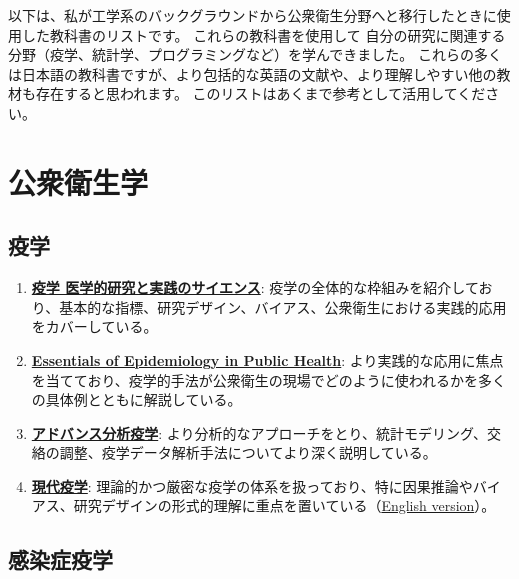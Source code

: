 \documentclass[uplatex]{jsarticle} %
\begin{document}
以下は、私が工学系のバックグラウンドから公衆衛生分野へと移行したときに使用した教科書のリストです。
これらの教科書を使用して
自分の研究に関連する分野（疫学、統計学、プログラミングなど）を学んできました。
これらの多くは日本語の教科書ですが、より包括的な英語の文献や、より理解しやすい他の教材も存在すると思われます。
このリストはあくまで参考として活用してください。

\section{公衆衛生学}

\subsection{疫学}

\begin{enumerate}
\item \href{https://www.molcom.jp/products/detail/52131/}{\textbf{疫学 医学的研究と実践のサイエンス}}: 
疫学の全体的な枠組みを紹介しており、基本的な指標、研究デザイン、バイアス、公衆衛生における実践的応用をカバーしている。

\item \href{https://www.academia.edu/43690544/ESSENTIALS_OF_FOURTH_EDITION}{\textbf{Essentials of Epidemiology in Public Health}}:
より実践的な応用に焦点を当てており、疫学的手法が公衆衛生の現場でどのように使われるかを多くの具体例とともに解説している。

\item \href{https://www.medsi.co.jp/products/detail/3742}{\textbf{アドバンス分析疫学}}:
より分析的なアプローチをとり、統計モデリング、交絡の調整、疫学データ解析手法についてより深く説明している。

\item \href{https://www.gakujutsu.co.jp/product/978-4-7806-1245-5/}{\textbf{現代疫学}}: 
理論的かつ厳密な疫学の体系を扱っており、特に因果推論やバイアス、研究デザインの形式的理解に重点を置いている（\href{https://www.amazon.co.jp/Modern-Epidemiology-Kenneth-J-Rothman/dp/1451190050}{English version}）。
\end{enumerate}

\subsection{感染症疫学}
\end{document}
